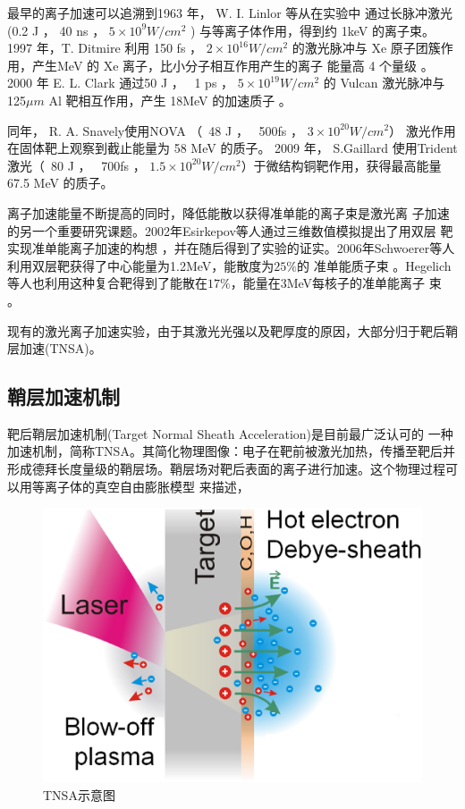最早的离子加速可以追溯到1963 年， W. I. Linlor 等从在实验中
通过长脉冲激光 (0.2 J ， 40 ns ， $5 \times {10}^9 W/{cm}^2$ ) 与等离子体作用，得到约 1keV
的离子束\cite{linlor1963ion}。1997 
年，T. Ditmire  利用 150 fs ， $2 \times {10}^{16} W/{cm}^2$ 的激光脉冲与 Xe
原子团簇作用，产生MeV 的 Xe 离子，比小分子相互作用产生的离子
能量高 4 个量级\cite{ditmire1997high} 。 2000 年 E. L. Clark 通过50 J ， 
~1 ps ， $5 \times {10}^{19} W/{cm}^2$
的 Vulcan 激光脉冲与 125$\mu m$ Al 靶相互作用，产生 18MeV 的加速质子\cite{clark2000measurements} 。


同年， R. A. Snavely使用NOVA （~48 J ， ~500fs ， $3 \times {10}^{20} W/{cm}^2$）
激光作用在固体靶上观察到截止能量为 58 MeV 的质子\cite{snavely2000intense}。
2009 年， S.Gaillard 使用Trident 
激光（~80 J ， ~700fs ， $1.5 \times {10}^{20} W/{cm}^2$）于微结构铜靶作用，获得最高能量67.5 MeV 的质子\cite{gaillard2011increased}。

离子加速能量不断提高的同时，降低能散以获得准单能的离子束是激光离
子加速的另一个重要研究课题。2002年Esirkepov等人通过三维数值模拟提出了用双层
靶实现准单能离子加速的构想\cite{esirkepov2002proposed}
，并在随后得到了实验的证实。2006年Schwoerer等人利用双层靶获得了中心能量为1.2MeV，能散度为$25\%$的
准单能质子束 \cite{schwoerer2006laser}。Hegelich
等人也利用这种复合靶得到了能散在$17\%$，能量在3MeV每核子的准单能离子
束 \cite{hegelich2006laser}。



现有的激光离子加速实验，由于其激光光强以及靶厚度的原因，大部分归于靶后鞘层加速(TNSA)\cite{hatchett2000electron}。


\subsection{鞘层加速机制}
靶后鞘层加速机制(Target Normal Sheath Acceleration)是目前最广泛认可的
一种加速机制，简称TNSA\cite{hatchett2000electron}。其简化物理图像：电子在靶前被激光加热，传播至靶后并形成德拜长度量级的鞘层场。鞘层场对靶后表面的离子进行加速。这个物理过程可以用等离子体的真空自由膨胀模型 \cite{mora2003plasma,mora2005thin}来描述，

\begin{figure}[!htbp]
  \centering
  \includegraphics[width=\MyFactor\textwidth]{Img/TNSA.eps}
  \caption{TNSA示意图}
  \label{fig:TNSA}
\end{figure}



